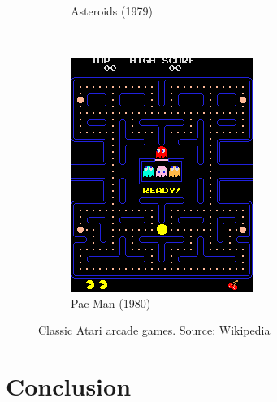 \expandafter\documentclass\expandafter[table, usenames, svgnames, dvipsnames, \classopts]{beamer}
\begin{document}
\begin{frame}
\begin{figure}
\begin{subfigure}[!h]{0.25\paperwidth}
	        \caption{Asteroids (1979)}
	    \end{subfigure}
	    ~
	    \begin{subfigure}[!h]{0.25\paperwidth}
	        \includegraphics[width=\textwidth]{pac-man}
	        \caption{Pac-Man (1980)}
	    \end{subfigure}
	    \caption{Classic Atari arcade games. Source: Wikipedia}
    \end{figure}

\end{frame}

\section{Conclusion}
\end{document}
